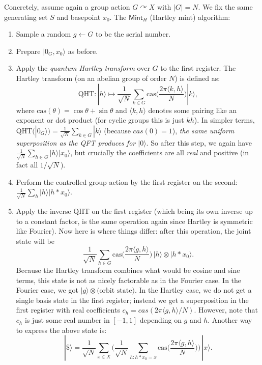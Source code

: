 \documentclass[12pt]{report}
\newcommand{\cas}{\mathrm{cas}}
\begin{document}
Concretely, assume again a group action $G \curvearrowright X$ with $|G|=N$. We fix the same generating set $S$ and basepoint $x_0$. The $\mathsf{Mint}_{H}$ (Hartley mint) algorithm:
\begin{enumerate}
    \item Sample a random $g \leftarrow G$ to be the serial number.
    \item Prepare $|0_G, x_0\rangle$ as before.
    \item Apply the \emph{quantum Hartley transform} over $G$ to the first register. The Hartley transform (on an abelian group of order $N$) is defined as:
    \[
       \mathrm{QHT}: |h\rangle \mapsto \frac{1}{\sqrt{N}} \sum_{k \in G} \cas \!\Big(\frac{2\pi \langle k,h \rangle}{N}\Big) |k\rangle,
    \] 
    where $\mathrm{cas}(\theta) = \cos \theta + \sin \theta$ and $\langle k,h \rangle$ denotes some pairing like an exponent or dot product (for cyclic groups this is just $kh$). In simpler terms, $\mathrm{QHT}(|0_G\rangle) = \frac{1}{\sqrt{N}}\sum_{k \in G} |k\rangle$ (because $cas(0)=1$), \emph{the same uniform superposition as the QFT produces for $|0\rangle$}. So after this step, we again have $\frac{1}{\sqrt{N}}\sum_{h \in G} |h\rangle|x_0\rangle$, but crucially the coefficients are all \emph{real} and positive (in fact all $1/\sqrt{N}$).
    \item Perform the controlled group action by the first register on the second: $\frac{1}{\sqrt{N}}\sum_{h} |h\rangle |h*x_0\rangle$.
    \item Apply the inverse QHT on the first register (which being its own inverse up to a constant factor, is the same operation again since Hartley is symmetric like Fourier). Now here is where things differ: after this operation, the joint state will be 
    \[
       \frac{1}{\sqrt{N}} \sum_{h \in G} \cas\!\Big(\frac{2\pi \langle g,h \rangle}{N}\Big)\, |h\rangle \otimes |h*x_0\rangle.
    \] 
    Because the Hartley transform combines what would be cosine and sine terms, this state is not as nicely factorable as in the Fourier case. In the Fourier case, we got $|g\rangle \otimes \text{(orbit state)}$. In the Hartley case, we do not get a single basis state in the first register; instead we get a superposition in the first register with real coefficients $c_h = cas(2\pi\langle g,h\rangle/N)$. However, note that $c_h$ is just some real number in $[-1,1]$ depending on $g$ and $h$. Another way to express the above state is:
    \[
      |\$\rangle = \frac{1}{\sqrt{N}} \sum_{x \in X} \Big(\frac{1}{\sqrt{N}}\sum_{h: h*x_0 = x} \cas\!\big(\frac{2\pi \langle g,h \rangle}{N}\big)\Big)\, |x\rangle.
\]
\end{enumerate}
\end{document}
